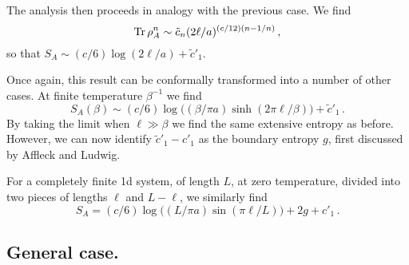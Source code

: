 \documentclass[12pt,aps]{revtex4}
\begin{document}
The analysis then proceeds in analogy with the previous case. We find
\begin{equation}
{\rm Tr}\,\rho_{A}^n\sim \tilde c_n(2\ell/a)^{(c/12)(n-1/n)}\,,
\end{equation}
so that
$S_A\sim(c/6)\log(2\ell/a)+{\tilde c}'_1$.

Once again, this result can be conformally transformed into a number of
other cases. At finite temperature $\beta^{-1}$ we find
\begin{equation}
S_A(\beta)\sim(c/6)\log\big((\beta/\pi a)\sinh(2\pi\ell/\beta)\big)+
{\tilde c}'_1\,.
\end{equation}
By taking the limit when $\ell\gg\beta$ we find the same extensive
entropy as before. However, we can now identify ${\tilde c}'_1-c'_1$
as the boundary entropy $g$, first discussed by
Affleck and Ludwig\cite{AffleckLudwig}.

For a completely finite 1d system, of length $L$, at
zero temperature, divided into two pieces of lengths $\ell$ and
$L-\ell$, we similarly find
\begin{equation}
S_A=(c/6)\log\big((L/\pi a)\sin(\pi\ell/L)\big)+2g+c'_1\,.
\end{equation}

\subsection{General case.}
\end{document}
